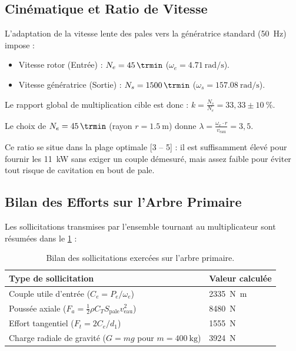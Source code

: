 \documentclass[11pt,a4paper]{article}
\begin{document}
\subsection{Cinématique et Ratio de Vitesse}
L'adaptation de la vitesse lente des pales vers la génératrice standard (\qty{50}{\hertz}) impose :
\begin{itemize}
    \item Vitesse rotor (Entrée) : $N_e = \qty{45}{\trmin}$ ($\omega_e = \qty{4.71}{\radian\per\second}$).
    \item Vitesse génératrice (Sortie) : $N_s = \qty{1500}{\trmin}$ ($\omega_s = \qty{157.08}{\radian\per\second}$).
\end{itemize}
Le rapport global de multiplication cible est donc : $k = \frac{N_s}{N_e} = 33{,}33 \pm \qty{10}{\percent}$.

\begin{tcolorbox}[colback=BoxBg, colframe=TealAccent, arc=4pt, boxrule=1pt, title=\textbf{Vérification du Tip Speed Ratio ($\lambda$)}]
Le choix de $N_e = \qty{45}{\trmin}$ (rayon $r = \qty{1.5}{\meter}$) donne $\lambda = \frac{\omega_e \cdot r}{v_{\text{eau}}} = 3{,}5$. \par\vspace{2mm}
Ce ratio se situe dans la plage optimale [3 -- 5] : il est suffisamment élevé pour fournir les \qty{11}{\kilo\watt} sans exiger un couple démesuré, mais assez faible pour éviter tout risque de cavitation en bout de pale.
\end{tcolorbox}

\subsection{Bilan des Efforts sur l'Arbre Primaire}
Les sollicitations transmises par l'ensemble tournant au multiplicateur sont résumées dans le \cref{tab:bilan_sollicitations_arbre1} :

\begin{table}[htbp]
\centering
\small
\caption{Bilan des sollicitations exercées sur l'arbre primaire.}
\label{tab:bilan_sollicitations_arbre1}
\begin{tabular}{ll}
    \toprule
    \textbf{Type de sollicitation} & \textbf{Valeur calculée} \\
    \midrule
    Couple utile d'entrée ($C_e = P_e / \omega_e$) & \qty{2335}{\newton\meter} \\
    Poussée axiale ($F_a = \frac{1}{2} \rho C_T S_{\text{pale}} v_{\text{eau}}^2$) & \qty{8480}{\newton} \\
    Effort tangentiel ($F_t = 2C_e / d_1$) & \qty{1555}{\newton} \\
    Charge radiale de gravité ($G = m g$ pour $m = \qty{400}{\kilo\gram}$) & \qty{3924}{\newton} \\
    \bottomrule
\end{tabular}
\end{table}
\end{document}
